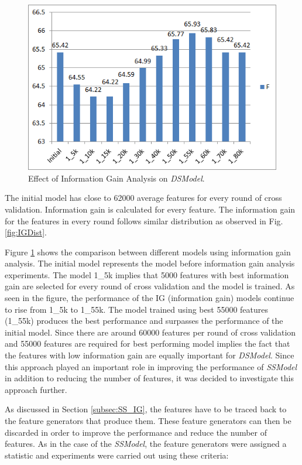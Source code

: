\begin{figure}
\centering
\includegraphics[scale=0.7]{figures/DSIGResults.png}
\caption{Effect of Information Gain Analysis on \textit{DSModel}.}\label{fig:DSIG}
\end{figure}


The initial model has close to 62000 average features for every round of cross validation. Information gain is calculated for every feature. The information gain for the features in every round follows similar distribution as observed in Fig. \ref{fig:IGDist}.

Figure \ref{fig:DSIG} shows the comparison between different models using information gain analysis. The initial model represents the model before information gain analysis experiments. The model 1\_5k implies that 5000 features with best information gain are selected for every round of cross validation and the model is trained. As seen in the figure, the performance of the IG (information gain) models continue to rise from 1\_5k to 1\_55k. The model trained using best 55000 features (1\_55k) produces the best performance and surpasses the performance of the initial model. Since there are around 60000 features per round of cross validation and 55000 features are required for best performing model implies the fact that the features with low information gain are equally important for \textit{DSModel}. Since this approach played an important role in improving the performance of \textit{SSModel} in addition to reducing the number of features, it was decided to investigate this approach further.

As discussed in Section \ref{subsec:SS_IG}, the features have to be traced back to the feature generators that produce them. These feature generators can then be discarded in order to improve the performance and reduce the number of features. As in the case of the \textit{SSModel}, the feature generators were assigned a statistic and experiments were carried out using these criteria:

